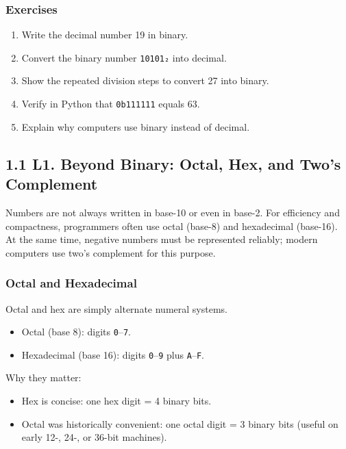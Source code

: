 \documentclass[
  letterpaper,
  DIV=11,
  numbers=noendperiod]{scrreprt}
\providecommand{\tightlist}{%
  \setlength{\itemsep}{0pt}\setlength{\parskip}{0pt}}
\begin{document}
\subsubsection{Exercises}\label{exercises}

\begin{enumerate}
\def\labelenumi{\arabic{enumi}.}
\tightlist
\item
  Write the decimal number 19 in binary.
\item
  Convert the binary number \texttt{10101₂} into decimal.
\item
  Show the repeated division steps to convert 27 into binary.
\item
  Verify in Python that \texttt{0b111111} equals 63.
\item
  Explain why computers use binary instead of decimal.
\end{enumerate}

\subsection{1.1 L1. Beyond Binary: Octal, Hex, and Two's
Complement}\label{l1.-beyond-binary-octal-hex-and-twos-complement}

Numbers are not always written in base-10 or even in base-2. For
efficiency and compactness, programmers often use octal (base-8) and
hexadecimal (base-16). At the same time, negative numbers must be
represented reliably; modern computers use two's complement for this
purpose.

\subsubsection{Octal and Hexadecimal}\label{octal-and-hexadecimal}

Octal and hex are simply alternate numeral systems.

\begin{itemize}
\tightlist
\item
  Octal (base 8): digits \texttt{0}--\texttt{7}.
\item
  Hexadecimal (base 16): digits \texttt{0}--\texttt{9} plus
  \texttt{A}--\texttt{F}.
\end{itemize}

Why they matter:

\begin{itemize}
\tightlist
\item
  Hex is concise: one hex digit = 4 binary bits.
\item
  Octal was historically convenient: one octal digit = 3 binary bits
  (useful on early 12-, 24-, or 36-bit machines).
\end{itemize}
\end{document}
